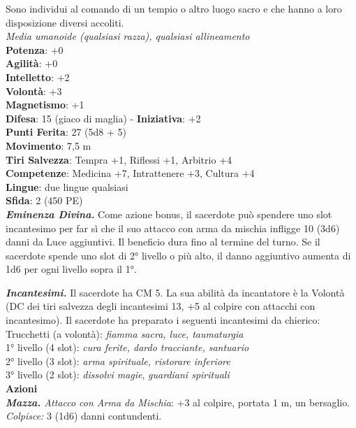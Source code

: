 \begin{multicols}{2}
Sono individui al comando di un tempio o altro luogo sacro e che hanno a loro disposizione diversi accoliti.\\
\emph{Media umanoide (qualsiasi razza), qualsiasi allineamento}\\
\textbf{Potenza}: +0\\
\textbf{Agilità}: +0\\
\textbf{Intelletto}: +2\\
\textbf{Volontà}: +3\\
\textbf{Magnetismo}: +1\\
\textbf{Difesa}: 15 (giaco di maglia) - \textbf{Iniziativa}: +2\\
\textbf{Punti Ferita}: 27 (5d8 + 5)\\
\textbf{Movimento}: 7,5 m\\
\textbf{Tiri Salvezza}: Tempra +1, Riflessi +1, Arbitrio +4 \\
\textbf{Competenze}: Medicina +7, Intrattenere +3, Cultura +4\\
\textbf{Lingue}: due lingue qualsiasi\\
\textbf{Sfida}: 2 (450 PE)\smallskip\\
\emph{\textbf{Eminenza Divina.}} Come azione bonus, il sacerdote può spendere uno slot incantesimo per far sì che il suo attacco con arma da mischia infligge 10 (3d6) danni da Luce aggiuntivi. Il beneficio dura fino al termine del turno. Se il sacerdote spende uno slot di 2° livello o più alto, il danno aggiuntivo aumenta di 1d6 per ogni livello sopra il 1°.

\emph{\textbf{Incantesimi.}} Il sacerdote ha CM 5. La sua abilità da incantatore è la Volontà (DC dei tiri salvezza degli incantesimi 13, +5 al colpire con attacchi con incantesimo). Il sacerdote ha preparato i seguenti incantesimi da chierico: \\
Trucchetti (a volontà): \emph{fiamma sacra, luce, taumaturgia}\\
1° livello (4 slot): \emph{cura ferite, dardo tracciante, santuario}\\
2° livello (3 slot): \emph{arma spirituale, ristorare inferiore}\\
3° livello (2 slot): \emph{dissolvi magie}, \emph{guardiani spirituali}\\
\smallskip\textbf{Azioni}\\
\emph{\textbf{Mazza.} Attacco con Arma da Mischia}: +3 al colpire, portata 1 m, un bersaglio.\\
\emph{Colpisce:} 3 (1d6) danni contundenti.\\


\end{multicols}
